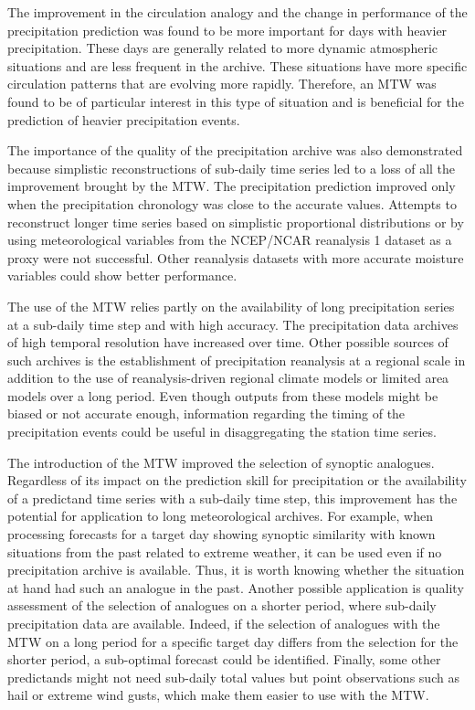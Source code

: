 \documentclass[hess, manuscript]{copernicus}
\begin{document}
	The improvement in the circulation analogy and the change in performance of the precipitation prediction was found to be more important for days with heavier precipitation. These days are generally related to more dynamic atmospheric situations and are less frequent in the archive. These situations have more specific circulation patterns that are evolving more rapidly. Therefore, an MTW was found to be of particular interest in this type of situation and is beneficial for the prediction of heavier precipitation events.
	
	The importance of the quality of the precipitation archive was also demonstrated because simplistic reconstructions of sub-daily time series led to a loss of all the improvement brought by the MTW. The precipitation prediction improved only when the precipitation chronology was close to the accurate values. Attempts to reconstruct longer time series based on simplistic proportional distributions or by using meteorological variables from the NCEP/NCAR reanalysis 1 dataset as a proxy were not successful. Other reanalysis datasets with more accurate moisture variables could show better performance.
	
	The use of the MTW relies partly on the availability of long precipitation series at a sub-daily time step and with high accuracy. The precipitation data archives of high temporal resolution have increased over time. Other possible sources of such archives is the establishment of precipitation reanalysis at a regional scale in addition to the use of reanalysis-driven regional climate models or limited area models over a long period. Even though outputs from these models might be biased or not accurate enough, information regarding the timing of the precipitation events could be useful in disaggregating the station time series.
	
	The introduction of the MTW improved the selection of synoptic analogues. Regardless of its impact on the prediction skill for precipitation or the availability of a predictand time series with a sub-daily time step, this improvement has the potential for application to long meteorological archives. For example, when processing forecasts for a target day showing synoptic similarity with known situations from the past related to extreme weather, it can be used even if no precipitation archive is available. Thus, it is worth knowing whether the situation at hand had such an analogue in the past. Another possible application is quality assessment of the selection of analogues on a shorter period, where sub-daily precipitation data are available. Indeed, if the selection of analogues with the MTW on a long period for a specific target day differs from the selection for the shorter period, a sub-optimal forecast could be identified. Finally, some other predictands might not need sub-daily total values but point observations such as hail or extreme wind gusts, which make them easier to use with the MTW.
	
\end{document}
